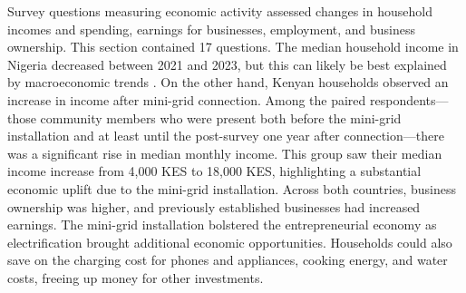 Survey questions measuring economic activity assessed changes in household incomes and spending, earnings for businesses, employment, and business ownership. This section contained 17 questions. The median household income in Nigeria decreased between 2021 and 2023, but this can likely be best explained by macroeconomic trends \cite{wb-nigeria-2,wb-nigeria-1}. On the other hand, Kenyan households observed an increase in income after mini-grid connection.
Among the paired respondents---those community members who were present both before the mini-grid installation and at least until the post-survey one year after connection---there was a significant rise in median monthly income. This group saw their median income increase from 4,000 KES to 18,000 KES, highlighting a substantial economic uplift due to the mini-grid installation.
Across both countries, business ownership was higher, and previously established businesses had increased earnings. The mini-grid installation bolstered the entrepreneurial economy as electrification brought additional economic opportunities. Households could also save on the charging cost for phones and appliances, cooking energy, and water costs, freeing up money for other investments.